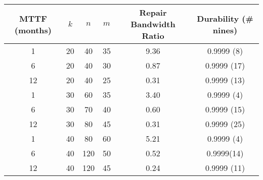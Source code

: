 \begin{table}[H]\centering


\begin{tabular}{| c | c c c | c | c|}\hline
MTTF (months) &$k$& $n$ & $m$ &Repair Bandwidth Ratio&Durability (\# nines) \\\hline
1 &20& 40 & 35 & 9.36 & 0.9999 (8) \\
6 &20& 40 & 30 & 0.87 & 0.9999 (17) \\
12 &20& 40 & 25 & 0.31 & 0.9999 (13)\\\hline

1 &30& 60 & 35 & 3.40 &0.9999 (4)\\
6 &30& 70 & 40 & 0.60 &0.9999 (15)\\
12 &30& 80 & 45 & 0.31 &0.9999 (25) \\\hline

1 &40& 80 & 60 & 5.21 &0.9999 (4)\\
6 &40&120&50 & 0.52 &0.9999(14)\\
12 &40&120&45 & 0.24 &0.9999 (11)\\\hline

\end{tabular}
\end{table}
